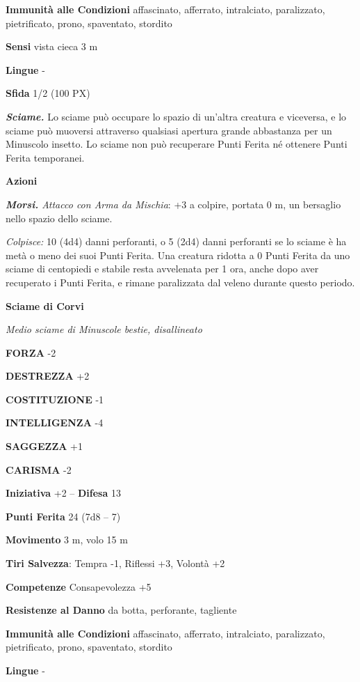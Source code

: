 \begin{multicols}{2}
	\textbf{Immunità alle Condizioni} affascinato, afferrato, intralciato, paralizzato, pietrificato, prono, spaventato, stordito

	\textbf{Sensi} vista cieca 3 m

	\textbf{Lingue} -

	\textbf{Sfida} 1/2 (100 PX)

	\textit{\textbf{Sciame.}} Lo sciame può occupare lo spazio di un'altra creatura e viceversa, e lo sciame può muoversi attraverso qualsiasi apertura grande abbastanza per un Minuscolo insetto. Lo sciame non può recuperare Punti Ferita né ottenere Punti Ferita temporanei.

	\textbf{Azioni}

	\textit{\textbf{Morsi.} Attacco con Arma da Mischia}: +3 a colpire, portata 0 m, un bersaglio nello spazio dello sciame.

	\textit{Colpisce:} 10 (4d4) danni perforanti, o 5 (2d4) danni perforanti se lo sciame è ha metà o meno dei suoi Punti Ferita. Una creatura ridotta a 0 Punti Ferita da uno sciame di centopiedi e stabile resta avvelenata per 1 ora, anche dopo aver recuperato i Punti Ferita, e rimane paralizzata dal veleno durante questo periodo.

	\medskip\textbf{Sciame di Corvi}

	\textit{Medio sciame di Minuscole bestie, disallineato}

	\textbf{FORZA} -2

	\textbf{DESTREZZA} +2

	\textbf{COSTITUZIONE} -1

	\textbf{INTELLIGENZA} -4

	\textbf{SAGGEZZA} +1

	\textbf{CARISMA} -2

	\textbf{Iniziativa} +2 -- \textbf{Difesa} 13

	\textbf{Punti Ferita} 24 (7d8 -- 7)

	\textbf{Movimento} 3 m, volo 15 m

	\textbf{Tiri Salvezza}: Tempra -1, Riflessi +3, Volontà +2

	\textbf{Competenze} Consapevolezza +5

	\textbf{Resistenze al Danno} da botta, perforante, tagliente

	\textbf{Immunità alle Condizioni} affascinato, afferrato, intralciato, paralizzato, pietrificato, prono, spaventato, stordito

	\textbf{Lingue} -


\end{multicols}

